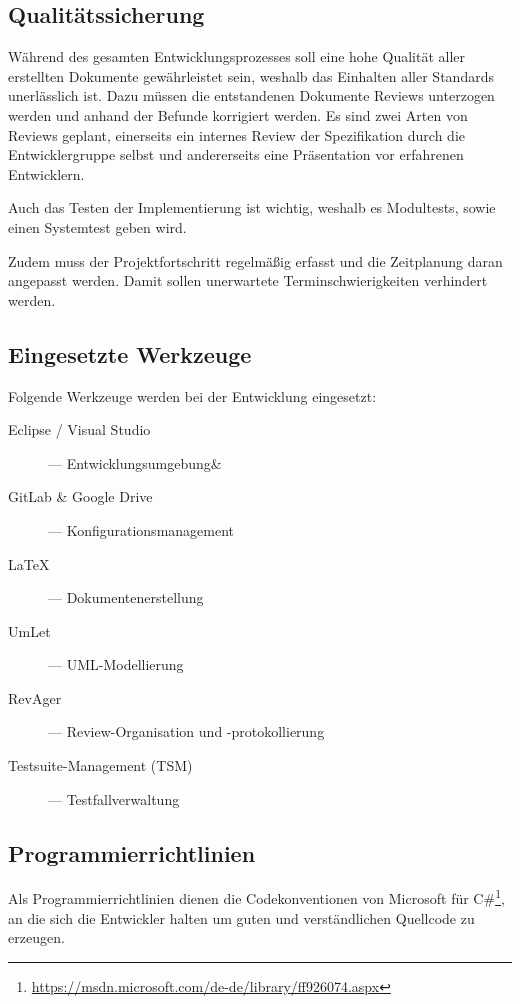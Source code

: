 \subsection{Qualitätssicherung}
Während des gesamten Entwicklungsprozesses soll eine hohe Qualität aller erstellten Dokumente gewährleistet sein, weshalb das Einhalten aller Standards unerlässlich ist.
Dazu müssen die entstandenen Dokumente Reviews unterzogen werden und anhand der Befunde korrigiert werden.
Es sind zwei Arten von Reviews geplant, einerseits ein internes Review der Spezifikation durch die Entwicklergruppe selbst und andererseits eine Präsentation vor erfahrenen Entwicklern.

Auch das Testen der Implementierung ist wichtig, weshalb es Modultests, sowie einen Systemtest geben wird.

Zudem muss der Projektfortschritt regelmäßig erfasst und die Zeitplanung \ggf daran angepasst werden.
Damit sollen unerwartete Terminschwierigkeiten verhindert werden.

\subsection{Eingesetzte Werkzeuge}
Folgende Werkzeuge werden bei der Entwicklung eingesetzt:
\begin{description}
	\item [Eclipse / Visual Studio] --- Entwicklungsumgebung\&
	\item [GitLab \& Google Drive] --- Konfigurationsmanagement
	\item [\LaTeX{}] --- Dokumentenerstellung
	\item [UmLet] --- UML-Modellierung
	\item [RevAger] --- Review-Organisation und -protokollierung
	\item [Testsuite-Management (TSM)] --- Testfallverwaltung
\end{description}

\subsection{Programmierrichtlinien}
Als Programmierrichtlinien dienen die Codekonventionen von Microsoft für C\#\footnote{\href{https://msdn.microsoft.com/de-de/library/ff926074.aspx}{https://msdn.microsoft.com/de-de/library/ff926074.aspx}}, an die sich die Entwickler halten um guten und verständlichen Quellcode zu erzeugen.

